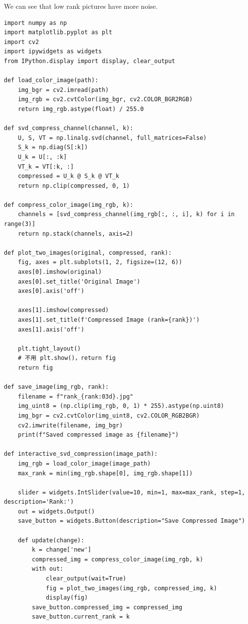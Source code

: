 We can see that low rank pictures have more noise. 

\begin{lstlisting}[language=iPython, caption={Source Code of SVD Compression}]
import numpy as np
import matplotlib.pyplot as plt
import cv2
import ipywidgets as widgets
from IPython.display import display, clear_output

def load_color_image(path):
    img_bgr = cv2.imread(path)
    img_rgb = cv2.cvtColor(img_bgr, cv2.COLOR_BGR2RGB)
    return img_rgb.astype(float) / 255.0

def svd_compress_channel(channel, k):
    U, S, VT = np.linalg.svd(channel, full_matrices=False)
    S_k = np.diag(S[:k])
    U_k = U[:, :k]
    VT_k = VT[:k, :]
    compressed = U_k @ S_k @ VT_k
    return np.clip(compressed, 0, 1)

def compress_color_image(img_rgb, k):
    channels = [svd_compress_channel(img_rgb[:, :, i], k) for i in range(3)]
    return np.stack(channels, axis=2)

def plot_two_images(original, compressed, rank):
    fig, axes = plt.subplots(1, 2, figsize=(12, 6))
    axes[0].imshow(original)
    axes[0].set_title('Original Image')
    axes[0].axis('off')

    axes[1].imshow(compressed)
    axes[1].set_title(f'Compressed Image (rank={rank})')
    axes[1].axis('off')

    plt.tight_layout()
    # 不用 plt.show()，return fig
    return fig

def save_image(img_rgb, rank):
    filename = f"rank_{rank:03d}.jpg"
    img_uint8 = (np.clip(img_rgb, 0, 1) * 255).astype(np.uint8)
    img_bgr = cv2.cvtColor(img_uint8, cv2.COLOR_RGB2BGR)
    cv2.imwrite(filename, img_bgr)
    print(f"Saved compressed image as {filename}")

def interactive_svd_compression(image_path):
    img_rgb = load_color_image(image_path)
    max_rank = min(img_rgb.shape[0], img_rgb.shape[1])

    slider = widgets.IntSlider(value=10, min=1, max=max_rank, step=1, description='Rank:')
    out = widgets.Output()
    save_button = widgets.Button(description="Save Compressed Image")

    def update(change):
        k = change['new']
        compressed_img = compress_color_image(img_rgb, k)
        with out:
            clear_output(wait=True)
            fig = plot_two_images(img_rgb, compressed_img, k)
            display(fig)
        save_button.compressed_img = compressed_img
        save_button.current_rank = k


\end{lstlisting}

